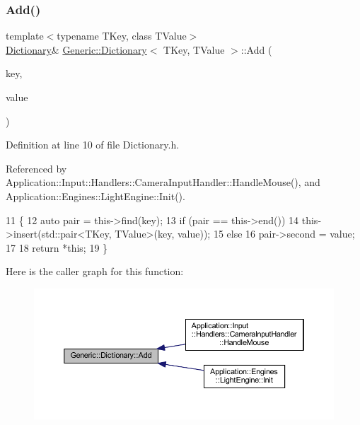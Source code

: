 \subsubsection{\texorpdfstring{Add()}{Add()}}
{\footnotesize\ttfamily template$<$typename T\+Key, class T\+Value$>$ \\
\mbox{\hyperlink{classGeneric_1_1Dictionary}{Dictionary}}\& \mbox{\hyperlink{classGeneric_1_1Dictionary}{Generic\+::\+Dictionary}}$<$ T\+Key, T\+Value $>$\+::Add (\begin{DoxyParamCaption}\item[{T\+Key}]{key,  }\item[{T\+Value}]{value }\end{DoxyParamCaption})\hspace{0.3cm}{\ttfamily [inline]}}



Definition at line 10 of file Dictionary.\+h.



Referenced by Application\+::\+Input\+::\+Handlers\+::\+Camera\+Input\+Handler\+::\+Handle\+Mouse(), and Application\+::\+Engines\+::\+Light\+Engine\+::\+Init().


\begin{DoxyCode}
11         \{
12             \textcolor{keyword}{auto} pair = this->find(key);
13             \textcolor{keywordflow}{if} (pair == this->end())
14                 this->insert(std::pair<TKey, TValue>(key, value));
15             \textcolor{keywordflow}{else}
16                 pair->second = value;
17             
18             \textcolor{keywordflow}{return} *\textcolor{keyword}{this};
19         \}
\end{DoxyCode}
Here is the caller graph for this function\+:
\nopagebreak
\begin{figure}[H]
\begin{center}
\leavevmode
\includegraphics[width=350pt]{classGeneric_1_1Dictionary_ae7cb006f801b21c172e8fbac8794fa99_icgraph}
\end{center}
\end{figure}
\mbox{\label{classGeneric_1_1Dictionary_ab368d54de28e7a3514e1add4bb5b3a36}} 
